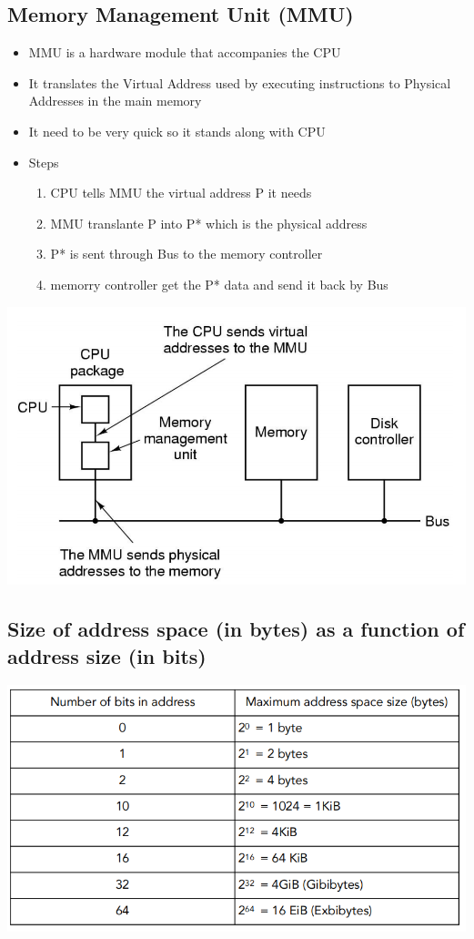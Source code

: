 \documentclass[12pt]{article}
\begin{document}
\subsection{Memory Management Unit (MMU)}
\begin{itemize}
    \item MMU is a hardware module that accompanies the CPU
    \item It translates the Virtual Address used by executing instructions to Physical Addresses in the main memory
    \item It need to be very quick so it stands along with CPU
    \item Steps \begin{enumerate}
        \item CPU tells MMU the virtual address P it needs
        \item MMU translante P into P* which is the physical address 
        \item P* is sent through Bus to the memory controller
        \item memorry controller get the P* data and send it back by Bus
    \end{enumerate}
\end{itemize}
\includegraphics[width=\textwidth]{MemoryManagementUnit.png}
\subsection{Size of address space (in bytes) as a function of address size (in bits)}
\includegraphics[width=\textwidth]{AddressSpaceSize.png}
\end{document}
